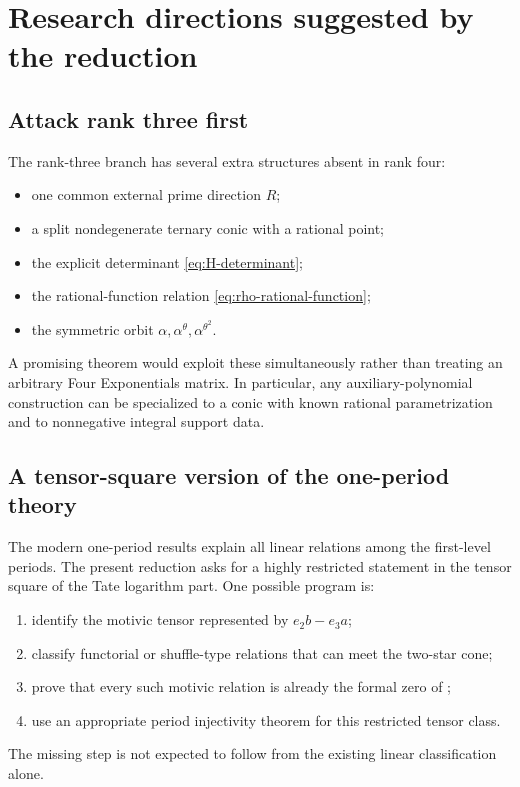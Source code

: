 \documentclass[11pt]{article}
\theoremstyle{definition}
\theoremstyle{remark}
\begin{document}
\section{Research directions suggested by the reduction}
\label{sec:research-directions}

\subsection{Attack rank three first}

The rank-three branch has several extra structures absent in rank four:
\begin{itemize}
\item one common external prime direction $R$;
\item a split nondegenerate ternary conic with a rational point;
\item the explicit determinant \eqref{eq:H-determinant};
\item the rational-function relation \eqref{eq:rho-rational-function};
\item the symmetric orbit $\alpha,\alpha^\theta,\alpha^{\theta^2}$.
\end{itemize}
A promising theorem would exploit these simultaneously rather than treating an arbitrary
Four Exponentials matrix.  In particular, any auxiliary-polynomial construction can be
specialized to a conic with known rational parametrization and to nonnegative integral
support data.

\subsection{A tensor-square version of the one-period theory}

The modern one-period results explain all linear relations among the first-level periods.
The present reduction asks for a highly restricted statement in the tensor square of the
Tate logarithm part.  One possible program is:
\begin{enumerate}[label=\textup{(\arabic*)}]
\item identify the motivic tensor represented by $e_2b-e_3a$;
\item classify functorial or shuffle-type relations that can meet the two-star cone;
\item prove that every such motivic relation is already the formal zero of
;
\item use an appropriate period injectivity theorem for this restricted tensor class.
\end{enumerate}
The missing step is not expected to follow from the existing linear classification alone.
\end{document}
